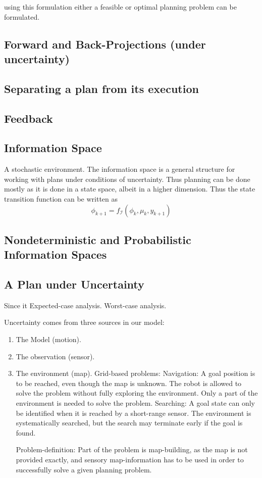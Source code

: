 using this formulation either a feasible or optimal planning problem can be
formulated.

\subsection{Forward and Back-Projections (under uncertainty)}

\subsection{Separating a plan from its execution}

\subsection{Feedback}

\subsection{Information Space}
A stochastic environment. The information space is a general structure for
working with plans under conditions of uncertainty. Thus planning can be done
mostly as it is done in a state space, albeit in a higher dimension. Thus the
state transition function can be written as
\[
  \phi_{k+1} = f_{\mathcal{I}}\left( \phi_k, \mu_k, y_{k+1} \right)
\]

\subsection{Nondeterministic and Probabilistic Information Spaces}

\subsection{A Plan under Uncertainty}
Since it Expected-case analysis. Worst-case analysis.

Uncertainty comes from three sources in our model:
\begin{enumerate}
\item The Model (motion).
\item The observation (sensor).
\item The environment (map). Grid-based problems: Navigation: A goal position is
  to be reached, even though the map is unknown. The robot is allowed to solve
  the problem without fully exploring the environment. Only a part of the
  environment is needed to solve the problem. Searching: A goal state can only
  be identified when it is reached by a short-range sensor. The environment is
  systematically searched, but the search may terminate early if the goal is
  found.

  Problem-definition: Part of the problem is map-building, as the map is not
  provided exactly, and sensory map-information has to be used in order to
  successfully solve a given planning problem.
\end{enumerate}

